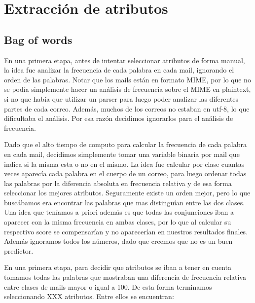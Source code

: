 \documentclass[10pt,a4paper]{article}
\begin{document}
\section{Extracción de atributos}

\subsection{Bag of words}

En una primera etapa, antes de intentar seleccionar atributos de forma manual, la idea fue analizar la frecuencia de cada palabra en cada mail, ignorando el orden de las palabras. Notar que los mails están en formato MIME, por lo que no se podía simplemente hacer un análisis de frecuencia sobre el MIME en plaintext, si no que había que utilizar un parser para luego poder analizar las diferentes partes de cada correo. Además, muchos de los correos no estaban en utf-8, lo que dificultaba el análisis. Por esa razón decidimos ignorarlos para el análisis de frecuencia.

Dado que el alto tiempo de computo para calcular la frecuencia de cada palabra en cada mail, decidimos simplemente tomar una variable binaria por mail que indica si la misma esta o no en el mismo. La idea fue calcular por clase cuantas veces aparecía cada palabra en el cuerpo de un correo, para luego ordenar todas las palabras por la diferencia absoluta en frecuencia relativa y de esa forma seleccionar los mejores atributos. Seguramente existe un orden mejor, pero lo que buscábamos era encontrar las palabras que mas distinguían entre las dos clases. Una idea que teníamos a priori además es que todas las conjunciones iban a aparecer con la misma frecuencia en ambas clases, por lo que al calcular su respectivo score se compensarían y no aparecerían en nuestros resultados finales. Además ignoramos todos los números, dado que creemos que no es un buen predictor.

En una primera etapa, para decidir que atributos se iban a tener en cuenta tomamos todas las palabras que mostraban una diferencia de frecuencia relativa entre clases de mails mayor o igual a 100. De esta forma terminamos seleccionando XXX atributos. Entre ellos se encuentran:
\end{document}
